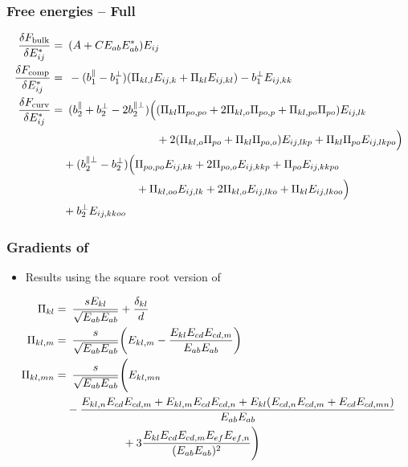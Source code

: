 \documentclass[10pt,mathserif]{beamer}
\begin{document}
\begin{frame}
    \frametitle{Free energies -- Full}
    \small
    \begin{align*}
        \fdv{F_\text{bulk}}{E_{ij}^*} =&\enspace \qty(A + C E_{ab}E_{ab}^*)E_{ij} \\
        \fdv{F_\text{comp}}{E_{ij}^*} =&\enspace -(b_1^\parallel - b_1^\perp) (\Pi_{kl,l} E_{ij,k} + \Pi_{kl} E_{ij,kl}) - b_1^\perp E_{ij,kk} \\
        \fdv{F_\text{curv}}{E_{ij}^*} =&\enspace (b_2^\parallel + b_2^\perp - 2b_2^{\parallel\perp}) \Bigl( (\Pi_{kl}\Pi_{po,po} + 2\Pi_{kl,o}\Pi_{po,p} + \Pi_{kl,po}\Pi_{po})E_{ij,lk} \\
        &\phantom{\enspace (b_2^\parallel + b_2^\perp - 2b_2^{\parallel\perp}) \Bigl(}+ 2(\Pi_{kl,o}\Pi_{po} + \Pi_{kl}\Pi_{po,o})E_{ij,lkp} + \Pi_{kl}\Pi_{po}E_{ij,lkpo} \Bigr) \nonumber \\
        &+ (b_2^{\parallel\perp} - b_2^\perp)\Bigl( \Pi_{po,po}E_{ij,kk} + 2\Pi_{po,o}E_{ij,kkp} + \Pi_{po}E_{ij,kkpo} \nonumber \\ 
        &\phantom{\enspace+ (b_2^{\parallel\perp} - b_2^\perp)\Bigl(}+ \Pi_{kl,oo}E_{ij,lk} + 2\Pi_{kl,o}E_{ij,lko} + \Pi_{kl}E_{ij,lkoo} \Bigr) \nonumber \\ 
        &+ b_2^\perp E_{ij,kkoo} \nonumber
    \end{align*}
\end{frame}

\begin{frame}
    \frametitle{Gradients of \PP}
    \begin{itemize}
        \item Results using the square root version of \PP
    \end{itemize}
    \begin{align*}
        \Pi_{kl} =&\enspace \frac{s E_{kl}}{\sqrt{E_{ab}E_{ab}}} + \frac{\delta_{kl}}{d} \\
        \Pi_{kl,m} =&\enspace \frac{s}{\sqrt{E_{ab}E_{ab}}} \qty(E_{kl,m} - \frac{E_{kl}E_{cd}E_{cd,m}}{E_{ab}E_{ab}}) \\
        \Pi_{kl,mn} =&\enspace \frac{s}{\sqrt{E_{ab}E_{ab}}} \Biggl(E_{kl,mn} \\ 
        &-\frac{E_{kl,n}E_{cd}E_{cd,m} + E_{kl,m}E_{cd}E_{cd,n} + E_{kl}(E_{cd,n}E_{cd,m} + E_{cd}E_{cd,mn})}{E_{ab}E_{ab}} \\
        &\phantom{\frac{s}{\sqrt{E_{ab}E_{ab}}} \Biggl(} + 3\frac{E_{kl}E_{cd}E_{cd,m}E_{ef}E_{ef,n}}{(E_{ab}E_{ab})^2} \Biggr)
    \end{align*}
\end{frame}
\end{document}

